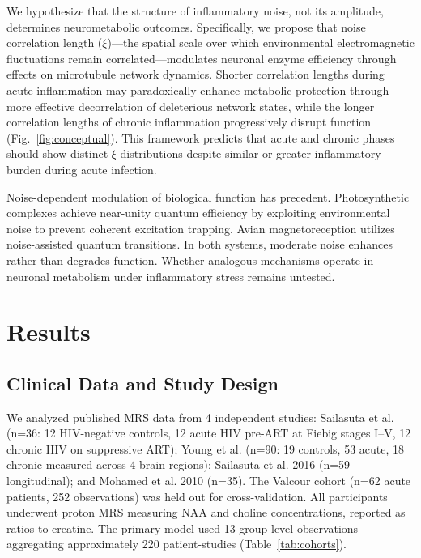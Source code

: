 \documentclass[10pt,a4paper]{article}
\begin{document}
We hypothesize that the structure of inflammatory noise, not its amplitude, determines neurometabolic outcomes. Specifically, we propose that noise correlation length ($\xi$)---the spatial scale over which environmental electromagnetic fluctuations remain correlated---modulates neuronal enzyme efficiency through effects on microtubule network dynamics\cite{craddock2017}. Shorter correlation lengths during acute inflammation may paradoxically enhance metabolic protection through more effective decorrelation of deleterious network states, while the longer correlation lengths of chronic inflammation progressively disrupt function (Fig.~\ref{fig:conceptual}). This framework predicts that acute and chronic phases should show distinct $\xi$ distributions despite similar or greater inflammatory burden during acute infection.

Noise-dependent modulation of biological function has precedent. Photosynthetic complexes achieve near-unity quantum efficiency by exploiting environmental noise to prevent coherent excitation trapping\cite{engel2007}. Avian magnetoreception utilizes noise-assisted quantum transitions\cite{lambert2013}. In both systems, moderate noise enhances rather than degrades function\cite{huelga2013}. Whether analogous mechanisms operate in neuronal metabolism under inflammatory stress remains untested.

\section{Results}

\subsection{Clinical Data and Study Design}

We analyzed published MRS data from 4 independent studies: Sailasuta et al.\cite{sailasuta2012} (n=36: 12 HIV-negative controls, 12 acute HIV pre-ART at Fiebig stages I--V, 12 chronic HIV on suppressive ART); Young et al.\cite{young2014} (n=90: 19 controls, 53 acute, 18 chronic measured across 4 brain regions); Sailasuta et al. 2016\cite{sailasuta2016} (n=59 longitudinal); and Mohamed et al. 2010 (n=35). The Valcour cohort\cite{valcour2012,valcour2013} (n=62 acute patients, 252 observations) was held out for cross-validation. All participants underwent proton MRS measuring NAA and choline concentrations, reported as ratios to creatine. The primary model used 13 group-level observations aggregating approximately 220 patient-studies (Table~\ref{tab:cohorts}).
\end{document}

